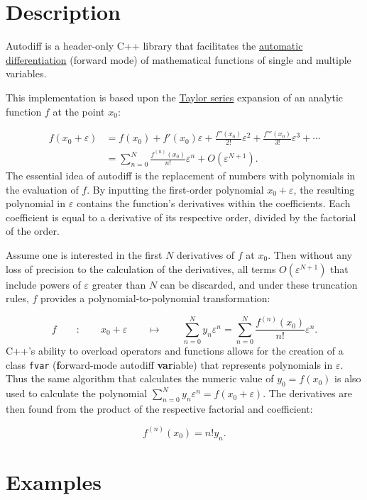 \documentclass{article}
\begin{document}
\section{Description}

Autodiff is a header-only C++ library that facilitates the
\href{https://en.wikipedia.org/wiki/Automatic_differentiation}{automatic differentiation} (forward mode) of
mathematical functions of single and multiple variables.

This implementation is based upon the \href{https://en.wikipedia.org/wiki/Taylor_series}{Taylor series} expansion of
an analytic function $f$ at the point $x_0$:

\begin{align*}
f(x_0+\varepsilon) &= f(x_0) + f'(x_0)\varepsilon + \frac{f''(x_0)}{2!}\varepsilon^2 + \frac{f'''(x_0)}{3!}\varepsilon^3 + \cdots \\
  &= \sum_{n=0}^N\frac{f^{(n)}(x_0)}{n!}\varepsilon^n + O\left(\varepsilon^{N+1}\right).
\end{align*}
The essential idea of autodiff is the replacement of numbers with polynomials in the evaluation of $f$. By inputting
the first-order polynomial $x_0+\varepsilon$, the resulting polynomial in $\varepsilon$ contains the function's
derivatives within the coefficients. Each coefficient is equal to a derivative of its respective order, divided
by the factorial of the order.

Assume one is interested in the first $N$ derivatives of $f$ at $x_0$. Then without any loss of precision to the
calculation of the derivatives, all terms $O\left(\varepsilon^{N+1}\right)$ that include powers of $\varepsilon$
greater than $N$ can be discarded, and under these truncation rules, $f$ provides a polynomial-to-polynomial
transformation:

\[
f \qquad : \qquad x_0+\varepsilon \qquad \mapsto \qquad
    \sum_{n=0}^Ny_n\varepsilon^n=\sum_{n=0}^N\frac{f^{(n)}(x_0)}{n!}\varepsilon^n.
\]
C++'s ability to overload operators and functions allows for the creation of a class {\tt fvar}
({\bf f}orward-mode autodiff {\bf var}iable) that represents polynomials in $\varepsilon$. Thus the
same algorithm that calculates the numeric value of $y_0=f(x_0)$ is also used to calculate the polynomial
$\sum_{n=0}^Ny_n\varepsilon^n=f(x_0+\varepsilon)$. The derivatives are then found from the product of the respective
factorial and coefficient:

\[ f^{(n)}(x_0)=n!y_n. \]

\section{Examples}
\end{document}
